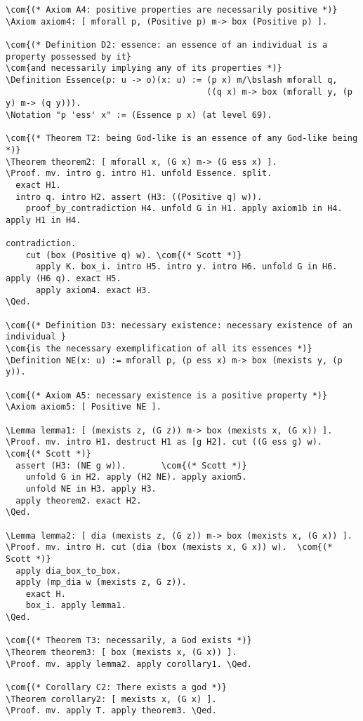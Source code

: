 \documentclass{llncs}
\newcommand{\red}[1]{\textcolor[rgb]{1,0,0}{#1}}
\newcommand{\blue}[1]{\textcolor[rgb]{0,0,1}{#1}}
\newcommand{\brown}[1]{\textcolor[rgb]{0.8,0.6,0.4}{#1}}
\newcommand{\Axiom}{\red{Axiom}}
\newcommand{\Lemma}{\red{Lemma}}
\newcommand{\Theorem}{\red{Theorem}}
\newcommand{\Definition}{\red{Definition}}
\newcommand{\Notation}{\blue{Notation}}
\newcommand{\Proof}{\blue{Proof}}
\newcommand{\Qed}{\blue{Qed}}
\newcommand{\com}[1]{\brown{#1}}
\newcommand{\bslash}{\symbol{92}}
\begin{document}
\begin{Verbatim}[commandchars=\\\{\},fontsize=\verbsize]
\com{(* Axiom A4: positive properties are necessarily positive *)}
\Axiom axiom4: [ mforall p, (Positive p) m-> box (Positive p) ].

\com{(* Definition D2: essence: an essence of an individual is a property possessed by it} 
\com{and necessarily implying any of its properties *)}
\Definition Essence(p: u -> o)(x: u) := (p x) m/\bslash mforall q, 
                                        ((q x) m-> box (mforall y, (p y) m-> (q y))).
\Notation "p 'ess' x" := (Essence p x) (at level 69).

\com{(* Theorem T2: being God-like is an essence of any God-like being *)}
\Theorem theorem2: [ mforall x, (G x) m-> (G ess x) ].
\Proof. mv. intro g. intro H1. unfold Essence. split.
  exact H1.
  intro q. intro H2. assert (H3: ((Positive q) w)).
    proof_by_contradiction H4. unfold G in H1. apply axiom1b in H4. apply H1 in H4. 
                                                                    contradiction. 
    cut (box (Positive q) w). \com{(* Scott *)}
      apply K. box_i. intro H5. intro y. intro H6. unfold G in H6. apply (H6 q). exact H5.
      apply axiom4. exact H3.
\Qed.

\com{(* Definition D3: necessary existence: necessary existence of an individual }
\com{is the necessary exemplification of all its essences *)}
\Definition NE(x: u) := mforall p, (p ess x) m-> box (mexists y, (p y)).

\com{(* Axiom A5: necessary existence is a positive property *)}
\Axiom axiom5: [ Positive NE ].

\Lemma lemma1: [ (mexists z, (G z)) m-> box (mexists x, (G x)) ].
\Proof. mv. intro H1. destruct H1 as [g H2]. cut ((G ess g) w). \com{(* Scott *)}
  assert (H3: (NE g w)).       \com{(* Scott *)}
    unfold G in H2. apply (H2 NE). apply axiom5.
    unfold NE in H3. apply H3.
  apply theorem2. exact H2.
\Qed.

\Lemma lemma2: [ dia (mexists z, (G z)) m-> box (mexists x, (G x)) ].
\Proof. mv. intro H. cut (dia (box (mexists x, G x)) w).  \com{(* Scott *)}
  apply dia_box_to_box.
  apply (mp_dia w (mexists z, G z)).
    exact H.
    box_i. apply lemma1.
\Qed.

\com{(* Theorem T3: necessarily, a God exists *)}
\Theorem theorem3: [ box (mexists x, (G x)) ].
\Proof. mv. apply lemma2. apply corollary1. \Qed.

\com{(* Corollary C2: There exists a god *)}
\Theorem corollary2: [ mexists x, (G x) ].
\Proof. mv. apply T. apply theorem3. \Qed.
\end{Verbatim}
\end{document}
